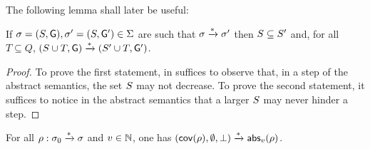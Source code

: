 The following lemma shall later be useful:
\begin{lemma}
\label{lem:adding_states_in_covset}
If $\sigma = (S, \mathsf{G}), \sigma' = (S, \mathsf{G}') \in \Sigma$ are such that $\sigma \xrightarrow{*} \sigma'$ then $S \subseteq S'$ and, for all $T \subseteq Q$, $(S \cup T, \mathsf{G}) \xrightarrow{*} (S' \cup T, \mathsf{G}')$. 
\end{lemma}
\begin{proof}
To prove the first statement, in suffices to observe that, in a step of the abstract semantics, the set $S$ may not decrease.
To prove the second statement, it suffices to notice in the abstract semantics that a larger $S$ may never hinder a step. 
\end{proof}

\begin{lemma}
For all $\rho: \sigma_0 \xrightarrow{*} \sigma$ and $v \in \mathbb{N}$, one has $(\mathsf{cov}(\rho), \emptyset, \bot) \xrightarrow{*} \mathsf{abs}_{v}(\rho)$. 
\end{lemma}
